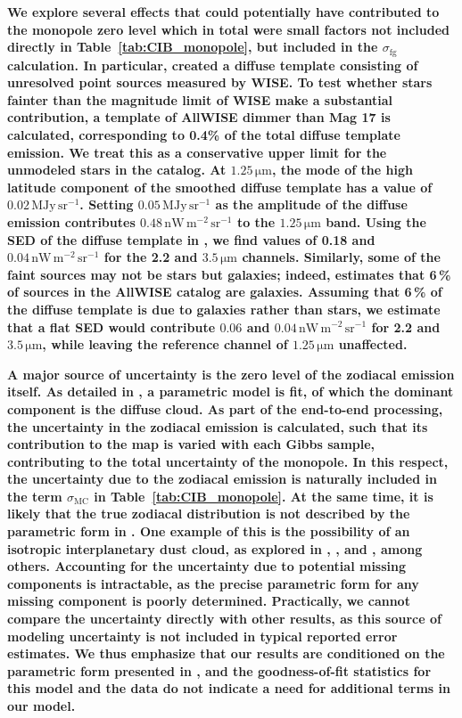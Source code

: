 \documentclass{aa}
\newcommand{\nWmsr}{\mathrm{nW}\,\mathrm{m}^{-2}\,\mathrm{sr}^{-1}}
\begin{document}
\textbf{
	We explore several effects that could potentially have
	contributed to the monopole zero level which in total were small
	factors not included directly in Table~\ref{tab:CIB_monopole}, but included in the $\sigma_\mathrm{fg}$ calculation.
	In particular, \citet{CG02_04} created a diffuse template
	consisting of unresolved point sources measured by WISE. To test whether stars
	fainter than the magnitude limit of WISE make a substantial contribution,
	a template of AllWISE dimmer than Mag 17 is calculated, corresponding
	to 0.4\% of the total diffuse template emission. We treat this as a
	conservative upper limit for the unmodeled stars in the catalog. At
	$1.25\,\mathrm{\mu m}$, the mode of the high latitude component of the
	smoothed diffuse template has a value of $0.02\,\mathrm{MJy\,sr^{-1}}$. Setting 
	$0.05\,\mathrm{MJy\,sr^{-1}}$ as the amplitude of the diffuse emission contributes 
	$0.48\,\nWmsr$ to the $1.25\,\mathrm{\mu m}$ band. Using the SED of the diffuse template in
	\citet{CG02_04}, we find values of 0.18 and $0.04\,\nWmsr$ for the 2.2
	and $3.5\,\mathrm{\mu m}$ channels.
	Similarly, some of the faint sources may not be stars but galaxies; indeed, \citet{kurcz2016} estimates that 6\,\% of sources in the AllWISE catalog are galaxies. Assuming that 6\,\% of the diffuse template is due to galaxies rather than stars, we estimate that a flat SED would contribute $0.06$ and $0.04\,\nWmsr$ for 2.2 and $3.5\,\mathrm{\mu m}$, while leaving the reference channel of $1.25\,\mathrm{\mu m}$ unaffected.
}

\textbf{
	A major source of uncertainty is the zero level of the zodiacal emission itself. As detailed in \citet{CG02_02}, a parametric model is fit, of which the dominant component is the diffuse cloud. As part of the end-to-end processing, the uncertainty in the zodiacal emission is calculated, such that its contribution to the map is varied with each Gibbs sample, contributing to the total uncertainty of the monopole. In this respect, the uncertainty due to the zodiacal emission is naturally included in the term $\sigma_\mathrm{MC}$ in Table~\ref{tab:CIB_monopole}. At the same time, it is likely that the true zodiacal distribution is not described by the parametric form in \citet{CG02_02}. One example of this is the possibility of an isotropic interplanetary dust cloud, as explored in \citet{Robinson2013}, \citet{sano:2020}, and \citet{obrien2025}, among others. Accounting for the uncertainty due to potential missing components is intractable, as the precise parametric form for any missing component is poorly determined. Practically, we cannot compare the uncertainty directly with other results, as this source of modeling uncertainty is not included in typical reported error estimates. We thus emphasize that our results are conditioned on the parametric form presented in \citet{CG02_02}, and the goodness-of-fit statistics for this model and the data do not indicate a need for additional terms in our model. 
}
\end{document}
